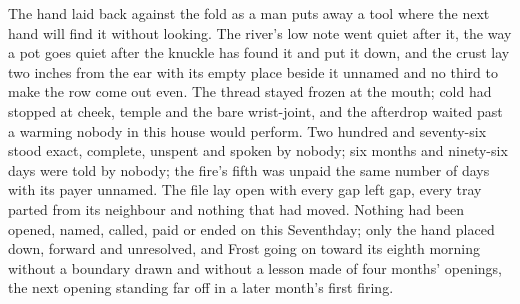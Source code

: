 The hand laid back against the fold as a man puts away a tool where the next hand will find it without looking. The river's low note went quiet after it, the way a pot goes quiet after the knuckle has found it and put it down, and the crust lay two inches from the ear with its empty place beside it unnamed and no third to make the row come out even. The thread stayed frozen at the mouth; cold had stopped at cheek, temple and the bare wrist-joint, and the afterdrop waited past a warming nobody in this house would perform. Two hundred and seventy-six stood exact, complete, unspent and spoken by nobody; six months and ninety-six days were told by nobody; the fire's fifth was unpaid the same number of days with its payer unnamed. The file lay open with every gap left gap, every tray parted from its neighbour and nothing that had moved. Nothing had been opened, named, called, paid or ended on this Seventhday; only the hand placed down, forward and unresolved, and Frost going on toward its eighth morning without a boundary drawn and without a lesson made of four months' openings, the next opening standing far off in a later month's first firing.
